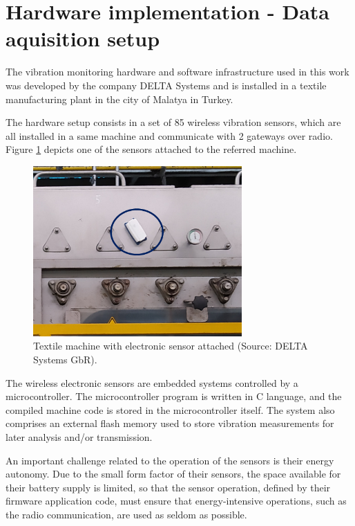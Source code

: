 \documentclass[conference]{IEEEtran}
\begin{document}
\section{Hardware implementation - Data aquisition setup}
\label{sec_implementation}

The vibration monitoring hardware and software infrastructure used in this work was developed by the company DELTA Systems and is installed in a textile manufacturing plant in the city of Malatya in Turkey.

The hardware setup consists in a set of 85 wireless vibration sensors, which are all installed in a same machine and communicate with 2 gateways over radio. Figure \ref{fig_sensor_on_machine} depicts one of the sensors attached to the referred machine.

\begin{figure}[htbp]
\centerline{\includegraphics[width=8cm]{graphics/delta/sensors_machine.png}}
\caption{Textile machine with electronic sensor attached (Source: DELTA Systems GbR).}
\label{fig_sensor_on_machine}
\end{figure}


The wireless electronic sensors are embedded systems controlled by a microcontroller. The microcontroller program is written in C language, and the compiled machine code is stored in the microcontroller itself. The system also comprises an external flash memory used to store vibration measurements for later analysis and/or transmission.

An important challenge related to the operation of the sensors is their energy autonomy. Due to the small form factor of their sensors, the space available for their battery supply is limited, so that the sensor operation, defined by their firmware application code, must ensure that energy-intensive operations, such as the radio communication, are used as seldom as possible.
\end{document}
